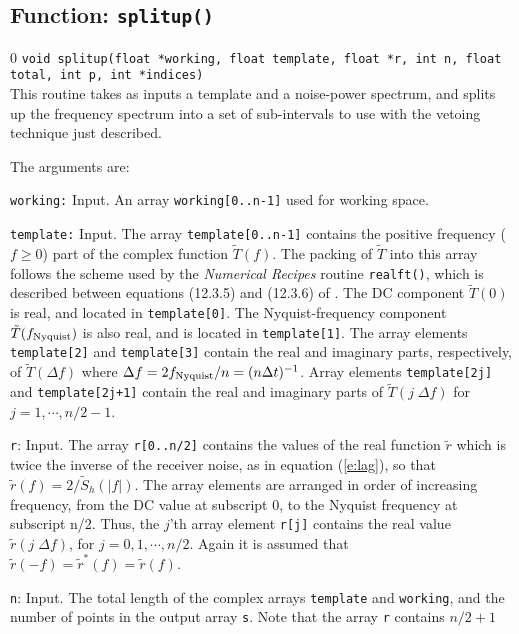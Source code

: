 \subsection{Function: {\tt splitup()}}
\label{ss:splitup}
\setcounter{equation}0
{\tt void splitup(float *working, float template, float *r, int n, float total, int p, int *indices)}\\
This routine takes as inputs a template and a noise-power spectrum, and
splits up the frequency spectrum into a set of sub-intervals to use
with the vetoing technique just described.

The arguments are:
\begin{description}
\item{\tt working:} Input.  An array {\tt working[0..n-1]} used for working space.
\item{\tt template:} Input.  The array {\tt template[0..n-1]} contains the positive
  frequency ($f \ge 0$) part of the complex function $\tilde T(f)$.
  The packing of $\tilde T$ into this array follows the scheme used by
  the {\it Numerical Recipes} routine {\tt realft()}, which is
  described between equations (12.3.5) and (12.3.6) of \cite{NumRec}.
  The DC component $\tilde T(0)$ is real, and located in {\tt template[0]}.
  The Nyquist-frequency component $\tilde T(f_{\rm Nyquist})$ is also
  real, and is located in {\tt template[1]}.  The array elements {\tt template[2]}
  and {\tt template[3]} contain the real and imaginary parts, respectively, of
  $\tilde T(\Delta f)$ where $\Delta f = 2 f_{\rm Nyquist}/n = (n
  \Delta t)^{-1}$.   Array elements {\tt template[2j]} and {\tt template[2j+1]}
  contain the real and imaginary parts of $\tilde T( j \; \Delta f)$
  for $j=1,\cdots,n/2-1$. 
\item{\tt r}: Input.  The array {\tt r[0..n/2]} contains the values of
  the real function $\tilde r$ which is twice the inverse of the receiver noise, as
  in equation (\ref{e:lag}), so that $\tilde r(f) = 2/\tilde
  S_h(|f|)$.  The array elements are arranged in order of increasing
  frequency, from the DC value at subscript 0, to the Nyquist frequency
  at subscript n/2.  Thus, the $j$'th array element {\tt r[j]} contains
  the real value $\tilde r(j \; \Delta f)$, for $j=0,1,\cdots,n/2$.
  Again it is assumed that $\tilde r(-f) = \tilde r^*(f) = \tilde r(f)$.
\item{\tt n}: Input.  The total length of the complex arrays
  {\tt template} and {\tt working}, and the number of points in the output
  array {\tt s}.  Note that the array {\tt r} contains $n/2+1$

\end{description}
